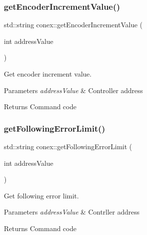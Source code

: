 \subsubsection{\texorpdfstring{get\+Encoder\+Increment\+Value()}{getEncoderIncrementValue()}}
{\footnotesize\ttfamily std\+::string conex\+::get\+Encoder\+Increment\+Value (\begin{DoxyParamCaption}\item[{int}]{address\+Value }\end{DoxyParamCaption})}



Get encoder increment value. 


\begin{DoxyParams}{Parameters}
{\em address\+Value} & Controller address \\
\hline
\end{DoxyParams}
\begin{DoxyReturn}{Returns}
Command code 
\end{DoxyReturn}
\mbox{\label{namespaceconex_a05d5f0585af94bb38ccf8037d86768e5}} 
\subsubsection{\texorpdfstring{get\+Following\+Error\+Limit()}{getFollowingErrorLimit()}}
{\footnotesize\ttfamily std\+::string conex\+::get\+Following\+Error\+Limit (\begin{DoxyParamCaption}\item[{int}]{address\+Value }\end{DoxyParamCaption})}



Get following error limit. 


\begin{DoxyParams}{Parameters}
{\em address\+Value} & Contrller address \\
\hline
\end{DoxyParams}
\begin{DoxyReturn}{Returns}
Command code 
\end{DoxyReturn}
\mbox{\label{namespaceconex_afaa116b8274daffbd23139bb930596f9}} 
